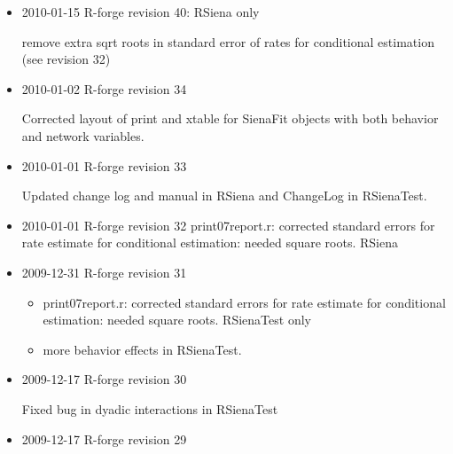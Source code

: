 \documentclass[a4paper,fleqn,11pt]{article}
\newcommand{\+}{\, + \,}
\newcommand{\sfn}[1]{\textsf{#1}}
\begin{document}
{\begin{small}
\begin{itemize}
\begin{itemize}
\item
   new effect: Popularity Alter, and altered effect1-3 to integers to correct
  bug in fix(myeff)
  \item new utility functions to update effects object
  \item no longer
  necessary to include underlying effects for interactions.
  \item user parameter for number of unspecified behavior interactions
  \item  remove extra sqrt roots in standard error of rates for conditional
  estimation (see revision 31)
\end{itemize}
\item 2010-01-15 R-forge revision 40: RSiena only

  remove extra sqrt roots in standard error of rates for conditional
  estimation (see revision 32)


\item 2010-01-02 R-forge revision 34

  Corrected layout of \sfn{print} and \sfn{xtable} for \sfn{SienaFit} objects
  with both behavior and network variables.

\item 2010-01-01 R-forge revision 33

Updated change log and manual in RSiena and \sfn{ChangeLog} in RSienaTest.

\item 2010-01-01 R-forge revision 32
    print07report.r: corrected standard errors for rate estimate for
    conditional estimation: needed square roots. RSiena

\item 2009-12-31 R-forge revision 31
\begin{itemize}
\item
    print07report.r: corrected standard errors for rate estimate for
    conditional estimation: needed square roots. RSienaTest only

\item more behavior effects in RSienaTest.
\end{itemize}

\item 2009-12-17 R-forge revision 30

Fixed bug in dyadic interactions in RSienaTest

\item 2009-12-17 R-forge revision 29


\end{itemize}
\end{small}}
\end{document}
